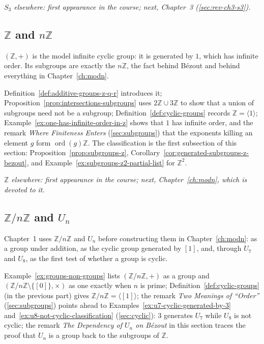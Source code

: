\documentclass[11pt]{report}
\begin{document}
\textit{$S_3$ elsewhere: first appearance in the course; next, Chapter~3 (\ref{sec:rev-ch3-s3}).}

\subsection{\texorpdfstring{$\mathbb{Z}$ and $n\mathbb{Z}$}{ℤ and nℤ}}\label{sec:rev-ch1-z}

$(\mathbb{Z}, +)$ is the model infinite cyclic group: it is generated by $1$, which has infinite order. Its subgroups are exactly the $n\mathbb{Z}$, the fact behind B\'ezout and behind everything in Chapter~\ref{ch:modn}.

Definition~\ref{def:additive-groups-z-q-r} introduces it; Proposition~\ref{prop:intersections-subgroups} uses $2\mathbb{Z} \cup 3\mathbb{Z}$ to show that a union of subgroups need not be a subgroup; Definition~\ref{def:cyclic-groups} records $\mathbb{Z} = \langle 1 \rangle$; Example~\ref{ex:one-has-infinite-order-in-z} shows that $1$ has infinite order, and the remark \emph{Where Finiteness Enters} (\ref{sec:subgroups}) that the exponents killing an element $g$ form $\operatorname{ord}(g)\mathbb{Z}$. The classification is the first subsection of this section: Proposition~\ref{prop:subgroups-z}, Corollary~\ref{cor:generated-subgroups-z-bezout}, and Example~\ref{ex:subgroups-z2-partial-list} for $\mathbb{Z}^2$.

\textit{$\mathbb{Z}$ elsewhere: first appearance in the course; next, Chapter~\ref{ch:modn}, which is devoted to it.}

\subsection{\texorpdfstring{$\mathbb{Z}/n\mathbb{Z}$ and $U_n$}{ℤ/nℤ and Uₙ}}\label{sec:rev-ch1-zn}

Chapter~1 uses $\mathbb{Z}/n\mathbb{Z}$ and $U_n$ before constructing them in Chapter~\ref{ch:modn}: as a group under addition, as the cyclic group generated by $[1]$, and, through $U_7$ and $U_8$, as the first test of whether a group is cyclic.

Example~\ref{ex:groups-non-groups} lists $(\mathbb{Z}/n\mathbb{Z}, +)$ as a group and $(\mathbb{Z}/n\mathbb{Z} \setminus \{[0]\}, \times)$ as one exactly when $n$ is prime; Definition~\ref{def:cyclic-groups} (in the previous part) gives $\mathbb{Z}/n\mathbb{Z} = \langle [1] \rangle$; the remark \emph{Two Meanings of ``Order''} (\ref{sec:subgroups}) points ahead to Examples~\ref{ex:u7-cyclic-generated-by-3} and~\ref{ex:u8-not-cyclic-classification} (\ref{sec:cyclic}): $3$ generates $U_7$ while $U_8$ is not cyclic; the remark \emph{The Dependency of $U_n$ on B\'ezout} in this section traces the proof that $U_n$ is a group back to the subgroups of $\mathbb{Z}$.
\end{document}
